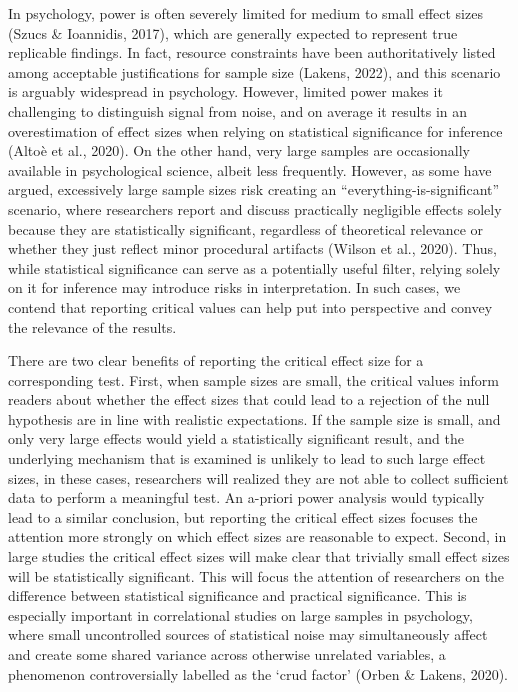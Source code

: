 \documentclass[
  man]{apa7}
\begin{document}
In psychology, power is often severely limited for medium to small effect sizes (Szucs \& Ioannidis, 2017), which are generally expected to represent true replicable findings. In fact, resource constraints have been authoritatively listed among acceptable justifications for sample size (Lakens, 2022), and this scenario is arguably widespread in psychology. However, limited power makes it challenging to distinguish signal from noise, and on average it results in an overestimation of effect sizes when relying on statistical significance for inference (Altoè et al., 2020). On the other hand, very large samples are occasionally available in psychological science, albeit less frequently. However, as some have argued, excessively large sample sizes risk creating an ``everything-is-significant'' scenario, where researchers report and discuss practically negligible effects solely because they are statistically significant, regardless of theoretical relevance or whether they just reflect minor procedural artifacts (Wilson et al., 2020). Thus, while statistical significance can serve as a potentially useful filter, relying solely on it for inference may introduce risks in interpretation. In such cases, we contend that reporting critical values can help put into perspective and convey the relevance of the results.

There are two clear benefits of reporting the critical effect size for a corresponding test. First, when sample sizes are small, the critical values inform readers about whether the effect sizes that could lead to a rejection of the null hypothesis are in line with realistic expectations. If the sample size is small, and only very large effects would yield a statistically significant result, and the underlying mechanism that is examined is unlikely to lead to such large effect sizes, in these cases, researchers will realized they are not able to collect sufficient data to perform a meaningful test. An a-priori power analysis would typically lead to a similar conclusion, but reporting the critical effect sizes focuses the attention more strongly on which effect sizes are reasonable to expect. Second, in large studies the critical effect sizes will make clear that trivially small effect sizes will be statistically significant. This will focus the attention of researchers on the difference between statistical significance and practical significance. This is especially important in correlational studies on large samples in psychology, where small uncontrolled sources of statistical noise may simultaneously affect and create some shared variance across otherwise unrelated variables, a phenomenon controversially labelled as the `crud factor' (Orben \& Lakens, 2020).
\end{document}
